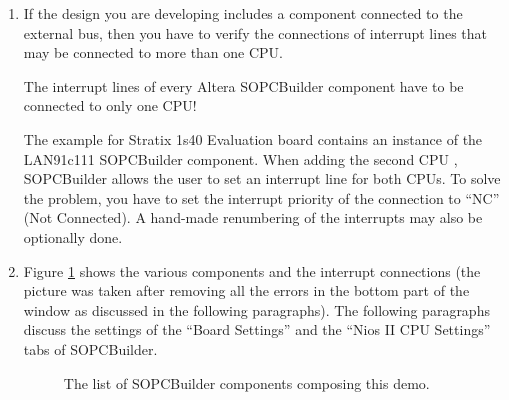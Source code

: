 \begin{enumerate}
\item If the design you are developing includes a component connected
  to the external bus, then you have to verify the connections of
  interrupt lines that may be connected to more than one CPU. 
  \begin{warning}
    The interrupt lines of every Altera SOPCBuilder component have to
    be connected to only one CPU!
  \end{warning}
  The  example for Stratix 1s40 Evaluation board
  contains an instance of the LAN91c111 SOPCBuilder component. When
  adding the second CPU , SOPCBuilder allows the user to
  set an interrupt line for both CPUs. To solve the problem, you have
  to set the interrupt priority of the  connection to
  ``NC'' (Not Connected). A hand-made renumbering of the interrupts
  may also be optionally done.

\item Figure \ref{fig:tutorial_sopcbuilder_final} shows the various
  components and the interrupt connections (the picture was taken
  after removing all the errors in the bottom part of the window as
  discussed in the following paragraphs). The following paragraphs
  discuss the settings of the ``Board Settings'' and the ``Nios II CPU
  Settings'' tabs of SOPCBuilder.
%
\begin{figure}

\caption{\label{fig:tutorial_sopcbuilder_final}The list of SOPCBuilder
components composing this demo.}
\end{figure}


\end{enumerate}
